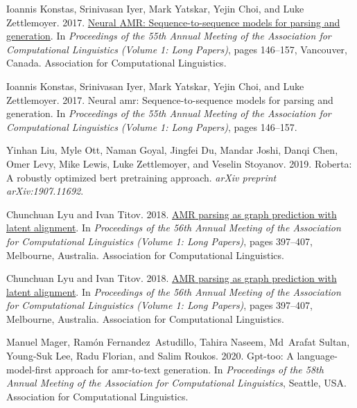\documentclass[11pt,a4paper]{article}
\begin{document}
\begin{thebibliography}{27}
Ioannis Konstas, Srinivasan Iyer, Mark Yatskar, Yejin Choi, and Luke
  Zettlemoyer. 2017{}.
\newblock \href {https://doi.org/10.18653/v1/P17-1014} {Neural {AMR}:
  Sequence-to-sequence models for parsing and generation}.
\newblock In \emph{Proceedings of the 55th Annual Meeting of the Association
  for Computational Linguistics (Volume 1: Long Papers)}, pages 146--157,
  Vancouver, Canada. Association for Computational Linguistics.

Ioannis Konstas, Srinivasan Iyer, Mark Yatskar, Yejin Choi, and Luke
  Zettlemoyer. 2017{}.
\newblock Neural amr: Sequence-to-sequence models for parsing and generation.
\newblock In \emph{Proceedings of the 55th Annual Meeting of the Association
  for Computational Linguistics (Volume 1: Long Papers)}, pages 146--157.

Yinhan Liu, Myle Ott, Naman Goyal, Jingfei Du, Mandar Joshi, Danqi Chen, Omer
  Levy, Mike Lewis, Luke Zettlemoyer, and Veselin Stoyanov. 2019.
\newblock Roberta: A robustly optimized bert pretraining approach.
\newblock \emph{arXiv preprint arXiv:1907.11692}.

Chunchuan Lyu and Ivan Titov. 2018{}.
\newblock \href {https://doi.org/10.18653/v1/P18-1037} {{AMR} parsing as graph
  prediction with latent alignment}.
\newblock In \emph{Proceedings of the 56th Annual Meeting of the Association
  for Computational Linguistics (Volume 1: Long Papers)}, pages 397--407,
  Melbourne, Australia. Association for Computational Linguistics.

Chunchuan Lyu and Ivan Titov. 2018{}.
\newblock \href {https://doi.org/10.18653/v1/P18-1037} {{AMR} parsing as graph
  prediction with latent alignment}.
\newblock In \emph{Proceedings of the 56th Annual Meeting of the Association
  for Computational Linguistics (Volume 1: Long Papers)}, pages 397--407,
  Melbourne, Australia. Association for Computational Linguistics.

Manuel Mager, Ram\'on Fernandez~Astudillo, Tahira Naseem, Md~Arafat Sultan,
  Young-Suk Lee, Radu Florian, and Salim Roukos. 2020.
\newblock Gpt-too: A language-model-first approach for amr-to-text generation.
\newblock In \emph{Proceedings of the 58th Annual Meeting of the Association
  for Computational Linguistics}, Seattle, USA. Association for Computational
  Linguistics.


\end{thebibliography}
\end{document}
